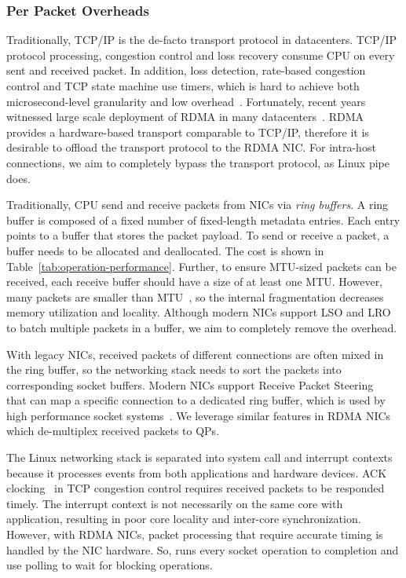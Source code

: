 \subsubsection{Per Packet Overheads}
\label{subsec:per-packet-overhead}
\quad

Traditionally, TCP/IP is the de-facto transport protocol in datacenters.
TCP/IP protocol processing, congestion control and loss recovery consume CPU on every sent and received packet.
In addition, loss detection, rate-based congestion control and TCP state machine use timers, which is hard to achieve both microsecond-level granularity and low overhead~\cite{jeong2014mtcp}.
Fortunately, recent years witnessed large scale deployment of RDMA in many datacenters~\cite{guo2016rdma,zhu2015congestion,mittal2015timely}.
RDMA provides a hardware-based transport comparable to TCP/IP, therefore it is desirable to offload the transport protocol to the RDMA NIC.
For intra-host connections, we aim to completely bypass the transport protocol, as Linux pipe does.

Traditionally, CPU send and receive packets from NICs via \emph{ring buffers}.
A ring buffer is composed of a fixed number of fixed-length metadata entries.
Each entry points to a buffer that stores the packet payload.
To send or receive a packet, a buffer needs to be allocated and deallocated.
The cost is shown in Table~\ref{tab:operation-performance}.
Further, to ensure MTU-sized packets can be received, each receive buffer should have a size of at least one MTU.
However, many packets are smaller than MTU~\cite{thompson1997wide}, so the internal fragmentation decreases memory utilization and locality.
Although modern NICs support LSO and LRO~\cite{lsolro} to batch multiple packets in a buffer, we aim to completely remove the overhead.

With legacy NICs, received packets of different connections are often mixed in the ring buffer, so the networking stack needs to sort the packets into corresponding socket buffers.
Modern NICs support Receive Packet Steering~\cite{mellanox} that can map a specific connection to a dedicated ring buffer, which is used by high performance socket systems~\cite{jeong2014mtcp,lin2016scalable,libvma}.
We leverage similar features in RDMA NICs which de-multiplex received packets to  QPs.

The Linux networking stack is separated into system call and interrupt contexts because it processes events from both applications and hardware devices.
ACK clocking~\cite{mprdma} in TCP congestion control requires received packets to be responded timely.
The interrupt context is not necessarily on the same core with application, resulting in poor core locality and inter-core synchronization.
However, with RDMA NICs, packet processing that require accurate timing is handled by the NIC hardware.
So, \libipc{} runs every socket operation to completion and use polling to wait for blocking operations.


